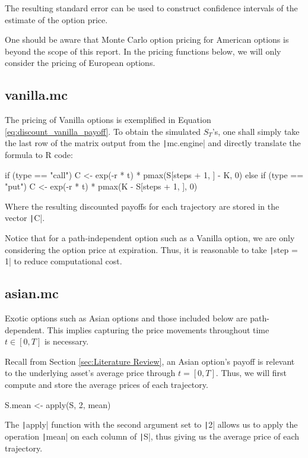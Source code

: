 The resulting standard error can be used to construct confidence intervals of the estimate of the option price.

One should be aware that Monte Carlo option pricing for American options is beyond the scope of this report. In the pricing functions below, we will only consider the pricing of European options.

\subsection{vanilla.mc}

The pricing of Vanilla options is exemplified in Equation \ref{eq:discount_vanilla_payoff}. To obtain the simulated $S_T$'s, one shall simply take the last row of the matrix output from the \texttt|mc.engine| and directly translate the formula to R code:

\begin{Rminted}
if (type == "call") {
    C <- exp(-r * t) * pmax(S[steps + 1, ] - K, 0)
} else if (type == "put") {
    C <- exp(-r * t) * pmax(K - S[steps + 1, ], 0)
}
\end{Rminted}

Where the resulting discounted payoffs for each trajectory are stored in the vector \texttt|C|.

Notice that for a path-independent option such as a Vanilla option, we are only considering the option price at expiration. Thus, it is reasonable to take \texttt|step = 1| to reduce computational cost.

\subsection{asian.mc}

Exotic options such as Asian options and those included below are path-dependent. This implies capturing the price movements throughout time $t\in[0,T]$ is necessary.

Recall from Section \ref{sec:Literature Review}, an Asian option's payoff is relevant to the underlying asset's average price through $t=[0,T]$. Thus, we will first compute and store the average prices of each trajectory.

\begin{Rminted}
S.mean <- apply(S, 2, mean)
\end{Rminted}

The \texttt|apply| function with the second argument set to \texttt|2| allows us to apply the operation \texttt|mean| on each column of \texttt|S|, thus giving us the average price of each trajectory.

